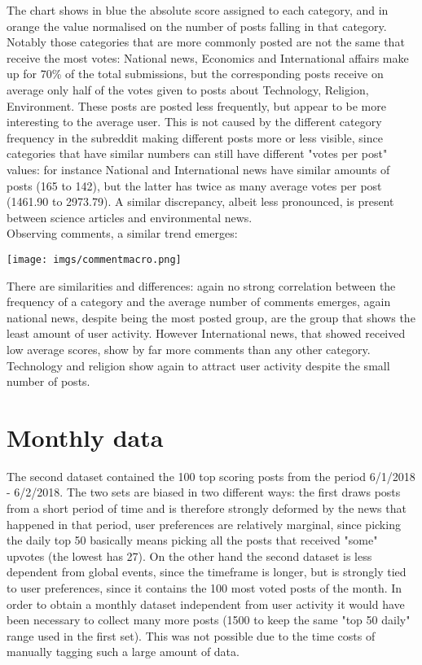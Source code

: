 \documentclass{article}
\begin{document}
The chart shows in blue the absolute score assigned to each category, and in orange the value normalised on the number of posts falling in that category. Notably those categories that are more commonly posted are not the same that receive the most votes: National news, Economics and International affairs make up for 70\% of the total submissions, but the corresponding posts receive on average only half of the votes given to posts about Technology, Religion, Environment. These posts are posted less frequently, but appear to be more interesting to the average user. This is not caused by the different category frequency in the subreddit making different posts more or less visible, since categories that have similar numbers can still have different "votes per post" values: for instance National and International news have similar amounts of posts (165 to 142), but the latter has twice as many average votes per post (1461.90 to 2973.79). A similar discrepancy, albeit less pronounced, is present between science articles and environmental news.\\
Observing comments, a similar trend emerges:

\bigskip

\texttt{[image: imgs/commentmacro.png]}

\bigskip

There are similarities and differences: again no strong correlation between the frequency of a category and the average number of comments emerges, again national news, despite being the most posted group, are the group that shows the least amount of user activity. However International news, that showed received low average scores, show by far more comments than any other category. Technology and religion show again to attract user activity despite the small number of posts.

\pagebreak
\section{Monthly data}
The second dataset contained the 100 top scoring posts from the period 6/1/2018 - 6/2/2018. The two sets are biased in two different ways: the first draws posts from a short period of time and is therefore strongly deformed by the news that happened in that period, user preferences are relatively marginal, since picking the daily top 50 basically means picking all the posts that received "some" upvotes (the lowest has 27). On the other hand the second dataset is less dependent from global events, since the timeframe is longer, but is strongly tied to user preferences, since it contains the 100 most voted posts of the month. In order to obtain a monthly dataset independent from user activity it would have been necessary to collect many more posts (1500 to keep the same "top 50 daily" range used in the first set). This was not possible due to the time costs of manually tagging such a large amount of data.
\end{document}
